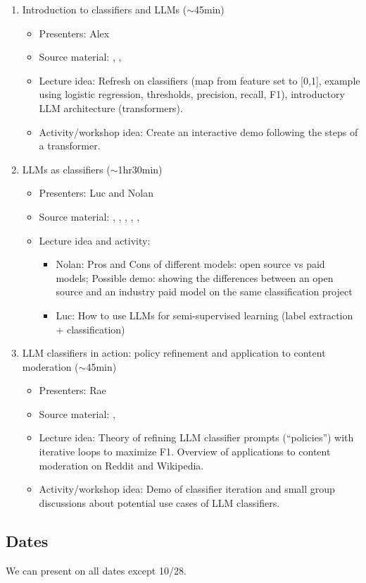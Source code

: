 \documentclass[12pt,notitlepage]{article}
\begin{document}
\begin{enumerate}
    \item Introduction to classifiers and LLMs (\(\sim\)45min)
    \begin{itemize}
        \item Presenters: Alex
        \item Source material: \textcite{IntroductionLargeLanguage}, \textcite{LargeLanguageModel}, \textcite{kumarLargeLanguageModels2024}
        \item Lecture idea: Refresh on classifiers (map from feature set to [0,1], example using logistic regression, thresholds, precision, recall, F1), introductory LLM architecture (transformers).
        \item Activity/workshop idea: Create an interactive demo following the steps of a transformer.
    \end{itemize}
    \item LLMs as classifiers (\(\sim\)1hr30min)
    \begin{itemize}
        \item Presenters: Luc and Nolan
        \item Source material: \textcite{youLLMasclassifierSemiSupervisedIterative2025}, \textcite{daiLLMClassifierLeveraging2025}, \textcite{TextClassificationLLMs}, \textcite{wangSmartExpertSystem2024}, \textcite{henrichsenTwoStageReasoningInfusedLearning2025}, \textcite{pangakisKnowledgeDistillationAutomated2024}
        \item Lecture idea and activity:
        \begin{itemize}
            \item Nolan: Pros and Cons of different models: open source vs paid models; Possible demo: showing the differences between an open source and an industry paid model on the same classification project
            \item Luc: How to use LLMs for semi-supervised learning (label extraction + classification) 
        \end{itemize}
    \end{itemize}
    \item LLM classifiers in action: policy refinement and application to content moderation (\(\sim\)45min)
    \begin{itemize}
        \item Presenters: Rae
        \item Source material: \textcite{kollaLLMMod2024CHI2024}, \textcite{chakrabartiCoPESmallLanguage2025}
        \item Lecture idea: Theory of refining LLM classifier prompts (``policies'') with iterative loops to maximize F1. Overview of applications to content moderation on Reddit and Wikipedia.
        \item Activity/workshop idea: Demo of classifier iteration and small group discussions about potential use cases of LLM classifiers.
    \end{itemize}
\end{enumerate}

\subsection*{Dates}
We can present on all dates except 10/28.


\clearpage
\printbibliography
\end{document}
